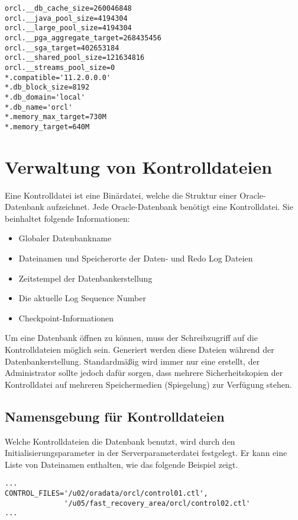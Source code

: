         \begin{lstlisting}[caption={Auszug aus einer Parameterdatei},label=admin24,language=terminal]
orcl.__db_cache_size=260046848
orcl.__java_pool_size=4194304
orcl.__large_pool_size=4194304
orcl.__pga_aggregate_target=268435456
orcl.__sga_target=402653184
orcl.__shared_pool_size=121634816
orcl.__streams_pool_size=0
*.compatible='11.2.0.0.0'
*.db_block_size=8192
*.db_domain='local'
*.db_name='orcl'
*.memory_max_target=730M
*.memory_target=640M
        \end{lstlisting}
    \section{Verwaltung von Kontrolldateien}
      Eine Kontrolldatei ist eine Binärdatei, welche die Struktur einer Oracle-Datenbank aufzeichnet. Jede Oracle-Datenbank benötigt eine Kontrolldatei. Sie beinhaltet folgende Informationen:
      \begin{itemize}
        \item Globaler Datenbankname
        \item Dateinamen und Speicherorte der Daten- und Redo Log Dateien
        \item Zeitstempel der Datenbankerstellung
        \item Die aktuelle Log Sequence Number
        \item Checkpoint-Informationen
      \end{itemize}
      Um eine Datenbank öffnen zu können, muss der Schreibzugriff auf die Kontrolldateien möglich sein. Generiert werden diese Dateien während der Datenbankerstellung. Standardmäßig wird immer nur eine erstellt, der Administrator sollte jedoch dafür sorgen, dass mehrere Sicherheitskopien der Kontrolldatei auf mehreren Speichermedien (Spiegelung) zur Verfügung stehen.
      \subsection{Namensgebung für Kontrolldateien}
        Welche Kontrolldateien die Datenbank benutzt, wird durch den Initialisierungsparameter  in der Serverparameterdatei festgelegt. Er kann eine Liste von Dateinamen enthalten, wie das folgende Beispiel zeigt.
				\begin{lstlisting}[caption={Der Parameter \parameter{control\_files}},label=admin25,language=terminal]
...
CONTROL_FILES='/u02/oradata/orcl/control01.ctl',
              '/u05/fast_recovery_area/orcl/control02.ctl'
...
        \end{lstlisting}
   
